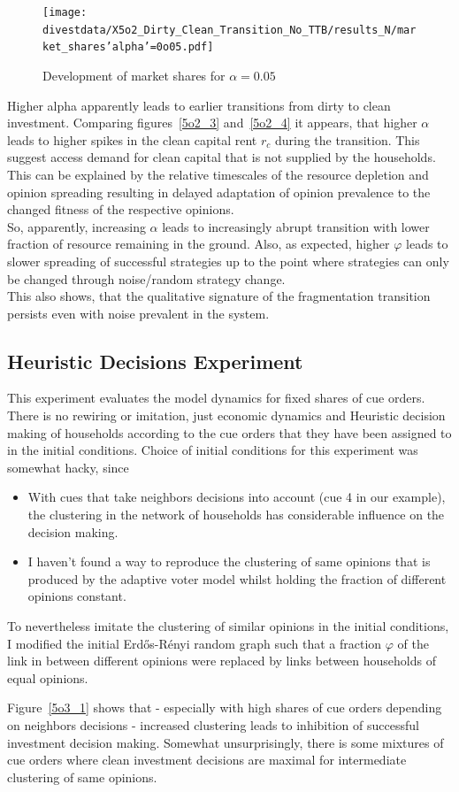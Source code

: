 \begin{figure}[H]
	\centering
	\texttt{[image: divestdata/X5o2\_Dirty\_Clean\_Transition\_No\_TTB/results\_N/market\_shares'alpha'=0o05.pdf]}
	\caption{Development of market shares for $\alpha=0.05$}

\end{figure}
Higher alpha apparently leads to earlier transitions from dirty to clean investment.
Comparing figures~\ref{5o2_3} and~\ref{5o2_4} it appears, that higher $\alpha$ leads to higher spikes in the clean capital rent $r_c$ during the transition. This suggest access demand for clean capital that is not supplied by the households. This can be explained by the relative timescales of the resource depletion and opinion spreading resulting in delayed adaptation of opinion prevalence to the changed fitness of the respective opinions.\\
So, apparently, increasing $\alpha$ leads to increasingly abrupt transition with lower fraction of resource remaining in the ground. Also, as expected, higher $\varphi$ leads to slower spreading of successful strategies up to the point where strategies can only be changed through noise/random strategy change. \\
This also shows, that the qualitative signature of the fragmentation transition persists even with noise prevalent in the system.

\subsection{Heuristic Decisions Experiment}

This experiment evaluates the model dynamics for fixed shares of cue orders. There is no rewiring or imitation, just economic dynamics and Heuristic decision making of households according to the cue orders that they have been assigned to in the initial conditions.
Choice of initial conditions for this experiment was somewhat hacky, since 
\begin{itemize}
	\item With cues that take neighbors decisions into account (cue 4 in our example), the clustering in the network of households has considerable influence on the decision making.
	\item I haven't found a way to reproduce the clustering of same opinions that is produced by the adaptive voter model whilst holding the fraction of different opinions constant. 
\end{itemize}
To nevertheless imitate the clustering of similar opinions in the initial conditions, I modified the initial Erd\H{o}s-R\'enyi random graph such that a fraction $\varphi$ of the link in between different opinions were replaced by links between households of equal opinions. 
\par
Figure~\ref{5o3_1} shows that - especially with high shares of cue orders depending on neighbors decisions - increased clustering leads to inhibition of successful investment decision making. Somewhat unsurprisingly, there is some mixtures of cue orders where clean investment decisions are maximal for intermediate clustering of same opinions.
